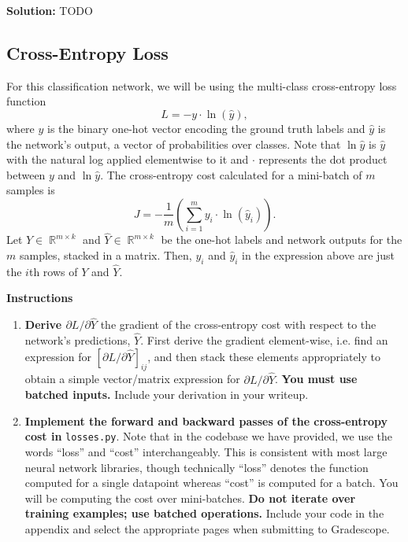 \documentclass{article}
\DeclareMathOperator{\R}{\mathbb{R}}
\newenvironment{solution}{\color{blue} \smallskip \textbf{Solution:}}{}
\begin{document}
\begin{solution}
    TODO
\end{solution}

\newpage
\subsection{Cross-Entropy Loss}
For this classification network, we will be using the multi-class cross-entropy loss function
\[
    L = -y \cdot \ln{(\hat{y})},
\]
where $y$ is the binary one-hot vector encoding the ground truth labels and $\hat{y}$ is the network's output, a vector of probabilities over classes. 
Note that $\ln\hat{y}$ is $\hat{y}$ with the natural log applied elementwise to it and $\cdot$ represents the dot product between $y$ and $\ln\hat{y}$. 
The cross-entropy cost calculated for a mini-batch of $m$ samples is
\[
    J = -\frac{1}{m}\left(\sum_{i=1}^m y_i \cdot \ln{(\hat{y}_i)}\right).
\]
Let $Y \in \R^{m \times k}$ and $\hat{Y} \in \R^{m \times k}$ be the one-hot labels and network outputs for the $m$ samples, stacked in a matrix. 
Then, $y_i$ and $\hat{y}_i$ in the expression above are just the $i$th rows of $Y$ and $\hat{Y}$.

\textbf{Instructions}
\begin{enumerate}
    \item 
    \textbf{Derive $\partial L/\partial \hat{Y}$} the gradient of the cross-entropy cost with respect to the network's predictions, $\hat{Y}$. 
    First derive the gradient element-wise, i.e. find an expression for $[\partial L/\partial \hat{Y}]_{ij}$, and then stack these elements appropriately to obtain a simple vector/matrix expression for $\partial L/\partial \hat{Y}$. 
    \textbf{You must use batched inputs.} Include your derivation in your writeup.
    
    \item 
    \textbf{Implement the forward and backward passes of the cross-entropy cost in} \texttt{losses.py}. 
    Note that in the codebase we have provided, we use the words ``loss'' and ``cost'' interchangeably. 
    This is consistent with most large neural network libraries, though technically ``loss'' denotes the function computed for a single datapoint whereas ``cost'' is computed for a batch. 
    You will be computing the cost over mini-batches. 
    \textbf{Do not iterate over training examples; use batched operations.} 
    Include your code in the appendix and select the appropriate pages when submitting to Gradescope.
\end{enumerate}
\end{document}
